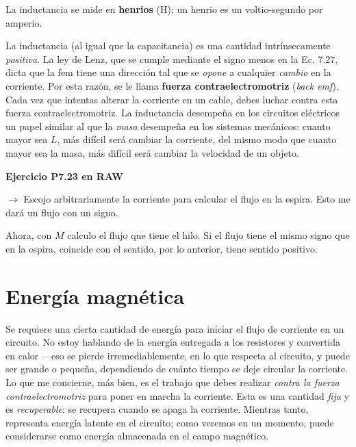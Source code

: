 \documentclass[12pt,a4paper]{report}
\newcommand{\esp}{\vspace{0.5cm}}
\begin{document}
	\esp
	
	La inductancia se mide en \textbf{henrios} (H); un henrio es un voltio-segundo por amperio.
	
	\esp
	
	La inductancia (al igual que la capacitancia) es una cantidad intrínsecamente \textit{positiva}. La ley de Lenz, que se cumple mediante el signo menos en la Ec. 7.27, dicta que la fem tiene una dirección tal que se \textit{opone} a cualquier \textit{cambio} en la corriente. Por esta razón, se le llama \textbf{fuerza contraelectromotriz} (\textit{back emf}). Cada vez que intentas alterar la corriente en un cable, debes luchar contra esta fuerza contraelectromotriz. La inductancia desempeña en los circuitos eléctricos un papel similar al que la \textit{masa} desempeña en los sistemas mecánicos: cuanto mayor sea $L$, más difícil será cambiar la corriente, del mismo modo que cuanto mayor sea la masa, más difícil será cambiar la velocidad de un objeto.
	
	\esp
	
	\noindent \textbf{Ejercicio P7.23 en RAW}
	
	\esp
	
	\begin{nota}
		$\rightarrow$ Escojo arbitrariamente la corriente para calcular el flujo en la espira. Esto me dará un flujo con un signo.
		
		\esp
		
		Ahora, con $M$ calculo el flujo que tiene el hilo. Si el flujo tiene el mismo signo que en la espira, coincide con el sentido, por lo anterior, tiene sentido positivo.
	\end{nota}
	
	\section{Energía magnética}
	
	Se requiere una cierta cantidad de energía para iniciar el flujo de corriente en un circuito. No estoy hablando de la energía entregada a los resistores y convertida en calor —eso se pierde irremediablemente, en lo que respecta al circuito, y puede ser grande o pequeña, dependiendo de cuánto tiempo se deje circular la corriente. Lo que me concierne, más bien, es el trabajo que debes realizar \textit{contra la fuerza contraelectromotriz} para poner en marcha la corriente. Esta es una cantidad \textit{fija} y es \textit{recuperable}: se recupera cuando se apaga la corriente. Mientras tanto, representa energía latente en el circuito; como veremos en un momento, puede considerarse como energía almacenada en el campo magnético.
	
\end{document}
